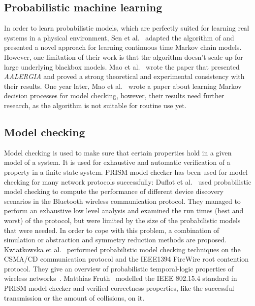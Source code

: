 \documentclass[
a4paper,
12pt
]{scrartcl}
\begin{document}
\subsection{Probabilistic machine learning}
In order to learn probabilistic models, which are perfectly suited for learning real systems in a physical environment, Sen et al.~\cite{Sen2004} adapted the algorithm of \cite{Carrasco.1994} and presented a novel approach for learning continuous time Markov chain models. However, one limitation of their work is that the algorithm doesn't scale up for large underlying blackbox models. Mao et al.~\cite{Mao.} wrote the paper that presented \emph{AALERGIA} and proved a strong theoretical and experimental consistency with their results. One year later, Mao et al.~\cite{Mao.2012} wrote a paper about learning Markov decision processes for model checking, however, their results need further research, as the algorithm is not suitable for routine use yet.

\subsection{Model checking}
Model checking is used to make sure that certain properties hold in a given model of a system. It is used for exhaustive and automatic verification of a property in a finite state system. PRISM model checker has been used for model checking for many network protocols successfully: Duflot et al.~\cite{DKNP06} used probabilistic model checking to compute the performance of different device discovery scenarios in the Bluetooth wireless communication protocol. They managed to perform an exhaustive low level analysis and examined the run times (best and worst) of the protocol, but were limited by the size of the probabilistic models that were needed. In order to cope with this problem, a combination of simulation or abstraction and symmetry reduction methods are proposed.
Kwiatkowska et al.~\cite{KNSW07} performed probabilistic model checking techniques on the CSMA/CD communication protocol and the IEEE1394 FireWire root contention protocol. They give an overview of probabilistic temporal-logic properties of wireless networks~\cite{KNP09a}.
Matthias Fruth~\cite{Fru06} modelled the IEEE 802.15.4 standard in PRISM model checker and verified correctness properties, like the successful transmission or the amount of collisions, on it.
\end{document}
